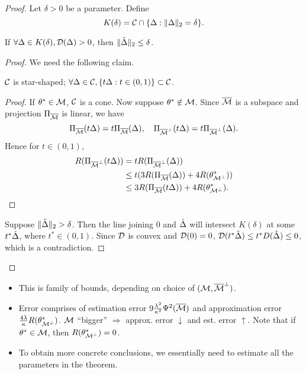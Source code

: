 \begin{proof}
    Let $\delta>0$ be a parameter. Define
    \begin{equation}
        K(\delta) = \mathcal{C} \cap \{\Delta:\|\Delta\|_2=\delta\}.
    \end{equation}

\begin{claim}
    If $\forall \Delta\in K(\delta), \mathcal{D}(\Delta)>0$, then $\|{\hat\Delta}\|_2\le\delta$.
\end{claim}

\begin{proof}

We need the following claim.

\begin{claim}
    $\mathcal{C}$ is star-shaped; \ie $\forall \Delta\in\mathcal{C}, \{t\Delta:t\in(0,1)\}\subset \mathcal{C}$.
\end{claim}

\begin{proof}
If $\theta^*\in\mathcal{M}$, $\mathcal{C}$ is a cone.
Now suppose $\theta^*\notin\mathcal{M}$.
Since ${\overline{\mathcal{M}}}$ is a subspace and projection $\Pi_{{\overline{\mathcal{M}}}}$ is linear,
we have
\begin{equation}
    \Pi_{{\overline{\mathcal{M}}}}(t\Delta) = t\Pi_{{\overline{\mathcal{M}}}}(\Delta), \quad
    \Pi_{{\overline{\mathcal{M}}}^\perp}(t\Delta) = t\Pi_{{\overline{\mathcal{M}}}^\perp}(\Delta).
\end{equation}
Hence for $t\in(0,1)$,
\begin{equation}
\begin{split}
    R(\Pi_{{\overline{\mathcal{M}}}^\perp}(t\Delta)) & = tR(\Pi_{{\overline{\mathcal{M}}}^\perp}(\Delta)) \\
        & \le t(3 R(\Pi_{{\overline{\mathcal{M}}}}(\Delta)) + 4R(\theta^*_{\mathcal{M}^\perp}))    \\
        & \le 3 R(\Pi_{{\overline{\mathcal{M}}}}(t\Delta)) + 4R(\theta^*_{\mathcal{M}^\perp}).
\end{split}
\end{equation}
\end{proof}

Suppose $\|{\hat\Delta}\|_2>\delta$.
Then the line joining $0$ and ${\hat\Delta}$ will intersect $K(\delta)$
at some $t^*{\hat\Delta}$, where $t^*\in(0,1)$.
Since $\mathcal{D}$ is convex and $\mathcal{D}(0)=0$,
$\mathcal{D}(t^*{\hat\Delta}) \le t^*D({\hat\Delta}) \le 0$,
which is a contradiction.
\end{proof}


\end{proof}

\begin{rmk}\leavevmode
\begin{itemize}
    \item This is family of bounds, depending on choice of $(\mathcal{M}, {\overline{\mathcal{M}}}^\perp)$.
    \item Error comprises of estimation error $9\frac{\lambda^2}{\kappa^2}\Psi^2({\overline{\mathcal{M}}})$ and
        approximation error $\frac{4\lambda}{\kappa}R(\theta^*_{\mathcal{M}^\perp})$.
        $\mathcal{M}$ ``bigger'' $\Rightarrow$ approx. error $\downarrow$ and est. error $\uparrow$.
        Note that if $\theta^*\in\mathcal{M}$, then $R(\theta^*_{\mathcal{M}^\perp})=0$.
    \item To obtain more concrete conclusions, we essentially need to estimate
        all the parameters in the theorem.
\end{itemize}
\end{rmk}
